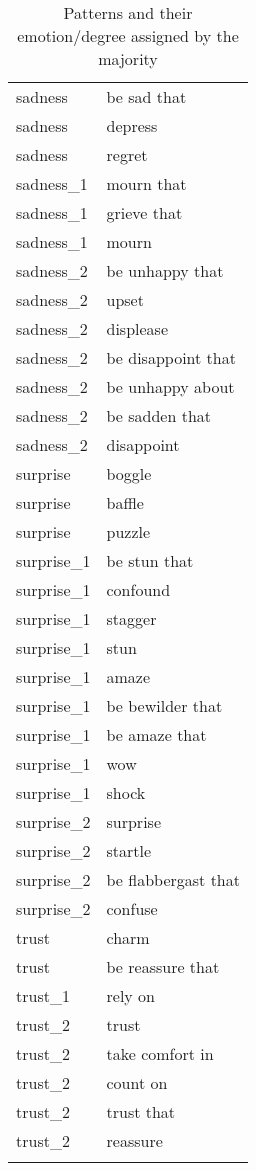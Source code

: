 \begin{longtable}{l|l}
sadness         & be sad that           \\
sadness         & depress               \\
sadness         & regret                \\
sadness\_1      & mourn that            \\
sadness\_1      & grieve that           \\
sadness\_1      & mourn                 \\
sadness\_2      & be unhappy that       \\
sadness\_2      & upset                 \\
sadness\_2      & displease             \\
sadness\_2      & be disappoint that    \\
sadness\_2      & be unhappy about      \\
sadness\_2      & be sadden that        \\
sadness\_2      & disappoint            \\
surprise        & boggle                \\
surprise        & baffle                \\
surprise        & puzzle                \\
surprise\_1     & be stun that          \\
surprise\_1     & confound              \\
surprise\_1     & stagger               \\
surprise\_1     & stun                  \\
surprise\_1     & amaze                 \\
surprise\_1     & be bewilder that      \\
surprise\_1     & be amaze that         \\
surprise\_1     & wow                   \\
surprise\_1     & shock                 \\
surprise\_2     & surprise              \\
surprise\_2     & startle               \\
surprise\_2     & be flabbergast that   \\
surprise\_2     & confuse               \\
trust           & charm                 \\
trust           & be reassure that      \\
trust\_1        & rely on               \\
trust\_2        & trust                 \\
trust\_2        & take comfort in       \\
trust\_2        & count on              \\
trust\_2        & trust that            \\
trust\_2        & reassure             \\
\caption{Patterns and their emotion/degree assigned by the majority}
\label{tab:majority_emotion_list}
\end{longtable}

